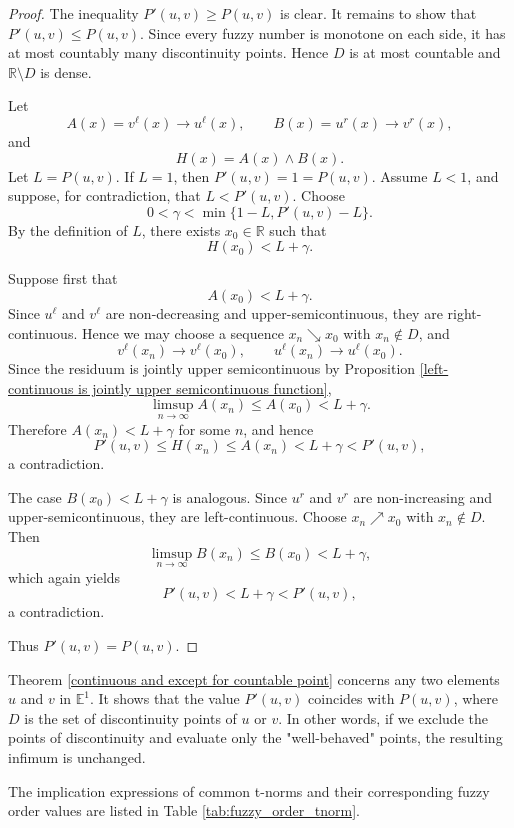 \documentclass[preprint,3p,times]{elsarticle}
\theoremstyle{plain}
\theoremstyle{definition}
\numberwithin{equation}{section}
\begin{document}
\begin{proof}
The inequality \(P'(u,v)\ge P(u,v)\) is clear. It remains to show that \(P'(u,v)\le P(u,v) \).
Since every fuzzy number is monotone on each side, it has
at most countably many discontinuity points. Hence \(D\) is at most
countable and \(\mathbb R\setminus D\) is dense.

Let
\[
A(x)=v^\ell(x)\rightarrow u^\ell(x),\qquad
B(x)=u^r(x)\rightarrow v^r(x),
\]
and
\[
H(x)=A(x)\wedge B(x).
\]
Let \(L=P(u,v)\). If \(L=1\), then
\(P'(u,v)=1=P(u,v)\). Assume \(L<1\), and suppose, for
contradiction, that \(L<P'(u,v)\). Choose
\[
0<\gamma<\min\{1-L,P'(u,v)-L\}.
\]
By the definition of \(L\), there exists \(x_0\in\mathbb R\) such that
\[
H(x_0)<L+\gamma.
\]

Suppose first that
\[
A(x_0)<L+\gamma.
\]
Since \(u^\ell\) and \(v^\ell\) are non-decreasing and
upper-semicontinuous, they are right-continuous. Hence we may choose
a sequence \(x_n\searrow x_0\) with \(x_n\notin D\), and
\[
v^\ell(x_n)\to v^\ell(x_0),\qquad
u^\ell(x_n)\to u^\ell(x_0).
\]
Since the residuum is jointly upper semicontinuous by Proposition \ref{left-continuous is jointly upper semicontinuous function},
\[
\limsup_{n\to\infty}A(x_n)\le A(x_0)<L+\gamma.
\]
Therefore \(A(x_n)<L+\gamma\) for some \(n\), and hence
\[
P'(u,v)\le H(x_n)\le A(x_n)<L+\gamma<P'(u,v),
\]
a contradiction.

The case \(B(x_0)<L+\gamma\) is analogous. Since \(u^r\) and
\(v^r\) are non-increasing and upper-semicontinuous, they are
left-continuous. Choose \(x_n\nearrow x_0\) with \(x_n\notin D\). Then
\[
\limsup_{n\to\infty}B(x_n)\le B(x_0)<L+\gamma,
\]
which again yields
\[
P'(u,v)< L+\gamma<P'(u,v),
\]
a contradiction.

Thus \(P'(u,v)=P(u,v)\).
\end{proof}

Theorem \ref{continuous and except for countable point} concerns any two elements \(u\) and \(v\) in \( \mathbb{E}^1 \). It shows that the value \(P'(u, v)\) coincides with \( P(u, v) \), where \(D\) is the set of discontinuity points of \(u\) or \(v\). In other words, if we exclude the points of discontinuity and evaluate only the "well-behaved" points, the resulting infimum is unchanged. 
 
The implication expressions of common t-norms and their corresponding fuzzy order values are listed in Table \ref{tab:fuzzy_order_tnorm}.
\end{document}
